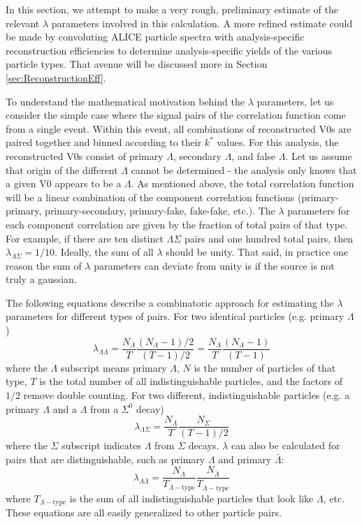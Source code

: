 In this section, we attempt to make a very rough, preliminary estimate of the relevant $\lambda$ parameters involved in this calculation.  A more refined estimate could be made by convoluting ALICE particle spectra with analysis-specific reconstruction efficiencies to determine analysis-specific yields of the various particle types.  That avenue will be discussed more in Section \ref{sec:ReconstructionEff}. 

To understand the mathematical motivation behind the $\lambda$ parameters, let us consider the simple case where the signal pairs of the correlation function come from a single event.  Within this event, all combinations of reconstructed V0s are paired together and binned according to their $k^*$ values.  For this analysis, the reconstructed V0s consist of primary $\Lambda$, secondary $\Lambda$, and false $\Lambda$.  Let us assume that origin of the different $\Lambda$ cannot be determined - the analysis only knows that a given V0 appears to be a $\Lambda$.  As mentioned above, the total correlation function will be a linear combination of the component correlation functions (primary-primary, primary-secondary, primary-fake, fake-fake, etc.).  The $\lambda$ parameters for each component correlation are given by the fraction of total pairs of that type.  For example, if there are ten distinct $\Lambda\Sigma$ pairs and one hundred total pairs, then $\lambda_{\Lambda\Sigma} = 1/10$.  Ideally, the sum of all $\lambda$ should be unity.  That said, in practice one reason the sum of $\lambda$ parameters can deviate from unity is if the source is not truly a gaussian.

The following equations describe a combinatoric approach for estimating the $\lambda$ parameters for different types of pairs.  For two identical particles (e.g. primary $\Lambda$) \begin{equation}
\label{eq:LambdaIdentical}
\lambda_{\Lambda\Lambda} = \frac{N_\Lambda}{T}\frac{(N_\Lambda -1)/2}{(T-1)/2} = \frac{N_\Lambda}{T}\frac{(N_\Lambda -1)}{(T-1)}
\end{equation}
where the $\Lambda$ subscript means primary $\Lambda$, $N$ is the number of particles of that type, $T$ is the total number of all indistinguishable particles, and the factors of $1/2$ remove double counting.  For two different, indistinguishable particles (e.g. a primary $\Lambda$ and a $\Lambda$ from a $\Sigma^0$ decay)
\begin{equation}
\lambda_{\Lambda\Sigma} = \frac{N_\Lambda}{T} \frac{N_\Sigma}{(T-1)/2}
\end{equation}
where the $\Sigma$ subscript indicates $\Lambda$ from $\Sigma$ decays.  $\lambda$ can also be calculated for pairs that are distinguishable, such as primary $\Lambda$ and primary $\bar{\Lambda}$:
\begin{equation}
\lambda_{\Lambda\bar{\Lambda}} = \frac{N_\Lambda}{T_{\Lambda-\mathrm{type}}} \frac{N_{\bar{\Lambda}}}{T_{\bar{\Lambda}-\mathrm{type}}}
\end{equation}
where $T_{\Lambda-\mathrm{type}}$ is the sum of all indistinguishable particles that look like $\Lambda$, etc.  These equations are all easily generalized to other particle pairs.

